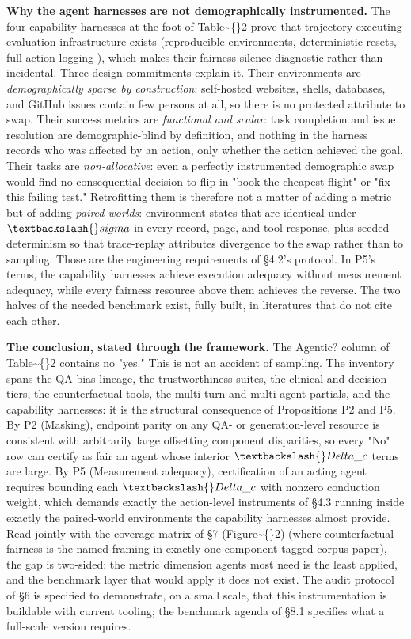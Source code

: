 \documentclass[10pt]{article}
\begin{document}
\textbf{Why the agent harnesses are not demographically instrumented.} The four capability harnesses at the foot of Table\textasciitilde\{\}2 prove that trajectory-executing evaluation infrastructure exists (reproducible environments, deterministic resets, full action logging \cite{zhou2024webarena,liu2024agentbench,deng2023mind2web,jimenez2024swe}), which makes their fairness silence diagnostic rather than incidental. Three design commitments explain it. Their environments are \emph{demographically sparse by construction}: self-hosted websites, shells, databases, and GitHub issues contain few persons at all, so there is no protected attribute to swap. Their success metrics are \emph{functional and scalar}: task completion and issue resolution are demographic-blind by definition, and nothing in the harness records who was affected by an action, only whether the action achieved the goal. Their tasks are \emph{non-allocative}: even a perfectly instrumented demographic swap would find no consequential decision to flip in "book the cheapest flight" or "fix this failing test." Retrofitting them is therefore not a matter of adding a metric but of adding \emph{paired worlds}: environment states that are identical under $\textbackslash\{\}sigma$ in every record, page, and tool response, plus seeded determinism so that trace-replay attributes divergence to the swap rather than to sampling. Those are the engineering requirements of \S{}4.2's protocol. In P5's terms, the capability harnesses achieve execution adequacy without measurement adequacy, while every fairness resource above them achieves the reverse. The two halves of the needed benchmark exist, fully built, in literatures that do not cite each other.

\textbf{The conclusion, stated through the framework.} The Agentic? column of Table\textasciitilde\{\}2 contains no "yes." This is not an accident of sampling. The inventory spans the QA-bias lineage, the trustworthiness suites, the clinical and decision tiers, the counterfactual tools, the multi-turn and multi-agent partials, and the capability harnesses: it is the structural consequence of Propositions P2 and P5. By P2 (Masking), endpoint parity on any QA- or generation-level resource is consistent with arbitrarily large offsetting component disparities, so every "No" row can certify as fair an agent whose interior $\textbackslash\{\}Delta\_c$ terms are large. By P5 (Measurement adequacy), certification of an acting agent requires bounding each $\textbackslash\{\}Delta\_c$ with nonzero conduction weight, which demands exactly the action-level instruments of \S{}4.3 running inside exactly the paired-world environments the capability harnesses almost provide. Read jointly with the coverage matrix of \S{}7 (Figure\textasciitilde\{\}2) (where counterfactual fairness is the named framing in exactly one component-tagged corpus paper), the gap is two-sided: the metric dimension agents most need is the least applied, and the benchmark layer that would apply it does not exist. The audit protocol of \S{}6 is specified to demonstrate, on a small scale, that this instrumentation is buildable with current tooling; the benchmark agenda of \S{}8.1 specifies what a full-scale version requires.
\end{document}
